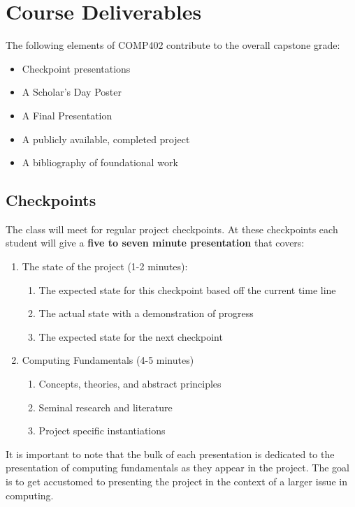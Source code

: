 \documentclass[10pt]{article}
\begin{document}
\section{Course Deliverables}

The following elements of COMP402 contribute to the overall capstone grade:
\begin{itemize}
\item Checkpoint presentations
\item A Scholar's Day Poster
\item A Final Presentation
\item A publicly available, completed project
\item A bibliography of foundational work
\end{itemize}


\subsection{Checkpoints}

The class will meet for regular project checkpoints. At these checkpoints each student will give a \textbf{five to seven minute presentation} that covers:
\begin{enumerate}
\item The state of the project (1-2 minutes): 
\begin{enumerate}
\item The expected state for this checkpoint based off the current time line 
\item The actual state with a demonstration of progress
\item The expected state for the next checkpoint
\end{enumerate}
\item Computing Fundamentals (4-5 minutes)
\begin{enumerate}
\item Concepts, theories, and abstract principles
\item Seminal research and literature
\item Project specific instantiations
\end{enumerate}
\end{enumerate}

It is important to note that the bulk of each presentation is dedicated to the presentation of computing fundamentals as they appear in the project. The goal is to get accustomed to presenting the project in the context of a larger issue in computing. 
\end{document}
